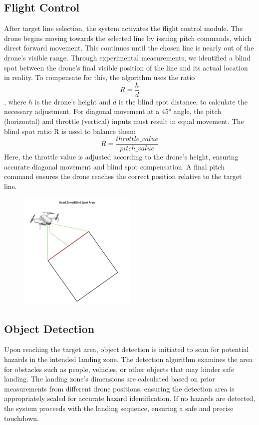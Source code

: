 \documentclass[unnumsec,webpdf,modern,large]{mam-authoring-template}%
\begin{document}
\subsection{Flight Control}
After target line selection, the system activates the flight control module. The drone begins moving towards the selected line by issuing pitch commands, which direct forward movement. This continues until the chosen line is nearly out of the drone’s visible range. Through experimental measurements, we identified a blind spot between the drone's final visible position of the line and its actual location in reality. 
To compensate for this, the algorithm uses the ratio $$ R=\frac{h}{d}$$, where $h$ is the drone’s height and $d$ is the blind spot distance, to calculate the necessary adjustment. 
For diagonal movement at a 45° angle, the pitch (horizontal) and throttle (vertical) inputs must result in equal movement. The blind spot ratio R is used to balance them: $$R = \frac{throttle\_value}{pitch\_value}$$ Here, the throttle value is adjusted according to the drone's height, ensuring accurate diagonal movement and blind spot compensation. A final pitch command ensures the drone reaches the correct position relative to the target line.

\begin{figure}[H]
    \centering
    \includegraphics[width=0.5\textwidth]{Blind Spot Area.png}  %
    \label{fig:Blind Spot Area.}
\end{figure}

\subsection{Object Detection}
Upon reaching the target area, object detection is initiated to scan for potential hazards in the intended landing zone. The detection algorithm examines the area for obstacles such as people, vehicles, or other objects that may hinder safe landing. The landing zone's dimensions are calculated based on prior measurements from different drone positions, ensuring the detection area is appropriately scaled for accurate hazard identification. If no hazards are detected, the system proceeds with the landing sequence, ensuring a safe and precise touchdown.
\end{document}
